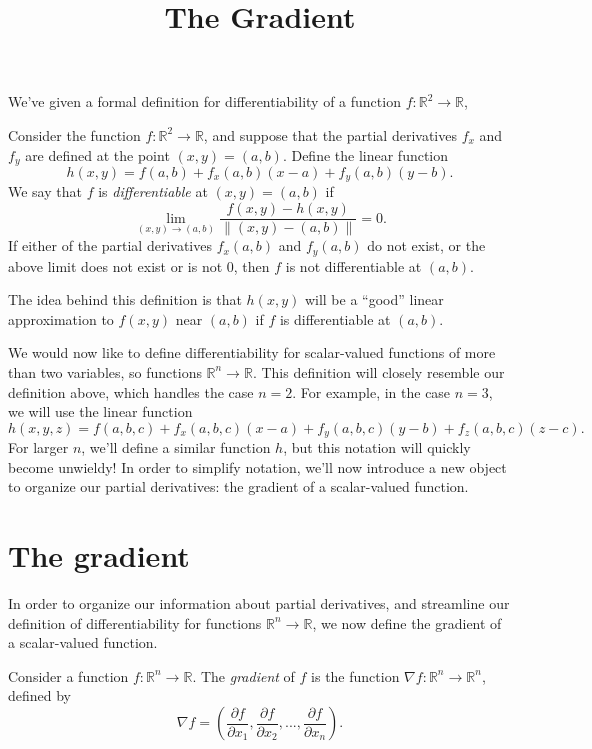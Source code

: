 \documentclass{ximera}
\title{The Gradient}
\begin{document}
\begin{abstract}
\end{abstract}
\maketitle

We've given a formal definition for differentiability of a function $f:\mathbb{R}^2\rightarrow\mathbb{R}$,

\begin{definition}
Consider the function $f:\mathbb{R}^2\rightarrow\mathbb{R}$, and suppose that the partial derivatives $f_x$ and $f_y$ are defined at the point $(x,y)=(a,b)$. Define the linear function
\[
h(x,y) = f(a,b) + f_x(a,b)(x-a)+f_y(a,b)(y-b).
\]
We say that $f$ is \emph{differentiable} at $(x,y) = (a,b)$ if
\[
\lim_{(x,y)\rightarrow (a,b)}\frac{f(x,y) - h(x,y)}{\|(x,y)-(a,b)\|} = 0.
\]
If either of the partial derivatives $f_x(a,b)$ and $f_y(a,b)$ do not exist, or the above limit does not exist or is not $0$, then $f$ is not differentiable at $(a,b)$.
\end{definition}

The idea behind this definition is that $h(x,y)$ will be a ``good'' linear approximation to $f(x,y)$ near $(a,b)$ if $f$ is differentiable at $(a,b)$.

We would now like to define differentiability for scalar-valued functions of more than two variables, so functions $\mathbb{R}^n\rightarrow \mathbb{R}$. This definition will closely resemble our definition above, which handles the case $n=2$. For example, in the case $n=3$, we will use the linear function
\[
h(x,y,z) = f(a,b,c) + f_x(a,b,c)(x-a) + f_y(a,b,c)(y-b)+f_z(a,b,c)(z-c).
\]
For larger $n$, we'll define a similar function $h$, but this notation will quickly become unwieldy! In order to simplify notation, we'll now introduce a new object to organize our partial derivatives: the gradient of a scalar-valued function.

\section*{The gradient}

In order to organize our information about partial derivatives, and streamline our definition of differentiability for functions $\mathbb{R}^n\rightarrow\mathbb{R}$, we now define the gradient of a scalar-valued function.

\begin{definition}
Consider a function $f:\mathbb{R}^n\rightarrow\mathbb{R}$. The \emph{gradient} of $f$ is the function $\nabla f:\mathbb{R}^n\rightarrow\mathbb{R}^n$, defined by
\[
\nabla f = \left(\frac{\partial f}{\partial x_1},\frac{\partial f}{\partial x_2},...,\frac{\partial f}{\partial x_n}\right).
\]
\end{definition}
\end{document}
